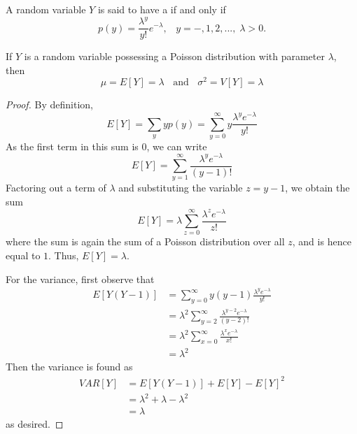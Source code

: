 \documentclass[12pt, a4paper, twoside, openright, titlepage]{book}
\begin{document}
\begin{defn}{}{}
    A random variable $Y$ is said to have a  if and only if \begin{equation*}
        p(y) = \frac{\lambda^y}{y!}e^{-\lambda},\;\;\; y = -,1,2,...,\;\lambda > 0.
    \end{equation*}
\end{defn}


\begin{thm}{}{}
    If $Y$ is a random variable possessing a Poisson distribution with parameter $\lambda$, then \begin{equation*}
        \mu = E[Y] = \lambda\;\;\text{ and }\;\;\sigma^2 = V[Y] = \lambda
    \end{equation*}
\end{thm}
\begin{proof}{}{}
    By definition, \begin{equation*}
        E[Y] = \sum_yyp(y) = \sum\limits_{y=0}^{\infty}y\frac{\lambda^ye^{-\lambda}}{y!}
    \end{equation*}
    As the first term in this sum is $0$, we can write \begin{equation*}
        E[Y] = \sum\limits_{y=1}^{\infty}\frac{\lambda^ye^{-\lambda}}{(y-1)!}
    \end{equation*}
    Factoring out a term of $\lambda$ and substituting the variable $z = y-1$, we obtain the sum \begin{equation*}
        E[Y] = \lambda\sum\limits_{z=0}^{\infty}\frac{\lambda^ze^{-\lambda}}{z!}
    \end{equation*}
    where the sum is again the sum of a Poisson distribution over all $z$, and is hence equal to $1$. Thus, $E[Y] = \lambda$.

    For the variance, first observe that \begin{align*}
        E[Y(Y-1)] &= \sum\limits_{y=0}^{\infty}y(y-1)\frac{\lambda^ye^{-\lambda}}{y!} \\
        &= \lambda^2\sum\limits_{y=2}^{\infty}\frac{\lambda^{y-2}e^{-\lambda}}{(y-2)!} \\
        &= \lambda^2\sum\limits_{x=0}^{\infty}\frac{\lambda^xe^{-\lambda}}{x!} \\
        &= \lambda^2
    \end{align*}
    Then the variance is found as \begin{align*}
        VAR[Y] &= E[Y(Y-1)] + E[Y] - E[Y]^2 \\
        &= \lambda^2+\lambda-\lambda^2 \\
        &= \lambda
    \end{align*}
    as desired.
\end{proof}
\end{document}
